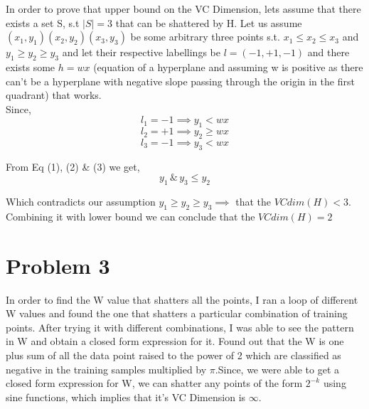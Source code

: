 \documentclass{article}
\begin{document}
In order to prove that upper bound on the VC Dimension, lets assume that there exists a set S, s.t $|S| = 3$ that can be shattered by H. Let us assume $(x_1,y_1) (x_2,y_2) (x_3,y_3)$ be some arbitrary three points s.t. $x_1 \leq x_2 \leq x_3$ and $y_1 \geq y_2 \geq y_3$ and let their respective labellings be $l=(-1, +1, -1)$ and there exists some $h = wx$ (equation of a hyperplane and assuming w is positive as there can't be a hyperplane with negative slope passing through the origin in the first quadrant) that works.\\

Since,
\begin{equation}
l_1 = -1 \implies y_1 < wx
\end{equation}
\begin{equation}
l_2 = +1 \implies y_2 \geq wx
\end{equation}
\begin{equation}
l_3 = -1 \implies y_3 < wx 
\end{equation}

From Eq (1), (2) \& (3) we get,
$$y_1 \,\&\, y_3 \leq y_2 $$

Which contradicts our assumption $y_1 \geq y_2 \geq y_3 \implies$ that the $VCdim(H) < 3$.\\

Combining it with lower bound we can conclude that the $VCdim(H) = 2$
\section*{Problem 3}

In order to find the W value that shatters all the points, I ran a loop of different W values and found the one that shatters a particular combination of training points. After trying it with different combinations, I was able to see the pattern in W and obtain a closed form expression for it. Found out that the W is one plus sum of all the data point raised to the power of 2 which are classified as negative in the training samples multiplied by $\pi$.Since, we were able to get a closed form expression for W, we can shatter any points of the form $2^{-k}$ using sine functions, which implies that it's VC Dimension is $\infty$.
\end{document}

